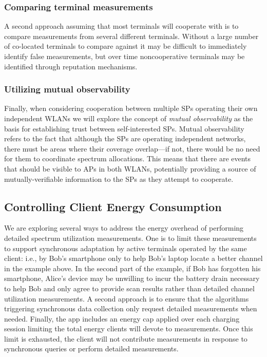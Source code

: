 \subsubsection{Comparing terminal measurements} A second approach
assuming that most terminals will cooperate with \PS{} is to compare
measurements from several different terminals. Without a large number of
co-located terminals to compare against it may be difficult to immediately
identify false measurements, but over time noncooperative terminals may be
identified through reputation mechanisms.

\subsubsection{Utilizing mutual observability} Finally, when
considering cooperation between multiple SPs operating their own independent
WLANs we will explore the concept of \textit{mutual observability} as the
basis for establishing trust between self-interested SPs. Mutual
observability refers to the fact that although the SPs are operating
independent networks, there must be areas where their coverage overlap---if
not, there would be no need for them to coordinate spectrum allocations. This
means that there are events that should be visible to APs in both WLANs,
potentially providing a source of mutually-verifiable information to the SPs
as they attempt to cooperate.

\subsection{Controlling Client Energy Consumption}
\label{subsec-energy}

We are exploring several ways to address the energy overhead of performing
detailed spectrum utilization measurements. One is to limit these
measurements to support synchronous adaptation by active terminals operated
by the same client: i.e., by Bob's smartphone only to help Bob's laptop
locate a better channel in the example above. In the second part of the
example, if Bob has forgotten his smartphone, Alice's device may be unwilling
to incur the battery drain necessary to help Bob and only agree to provide
scan results rather than detailed channel utilization measurements. A second
approach is to ensure that the algorithms triggering synchronous data
collection only request detailed measurements when needed. Finally, the
\PS{} app includes an energy cap applied over each charging session
limiting the total energy clients will devote to \PS{} measurements.
Once this limit is exhausted, the client will not contribute measurements in
response to synchronous queries or perform detailed measurements.

